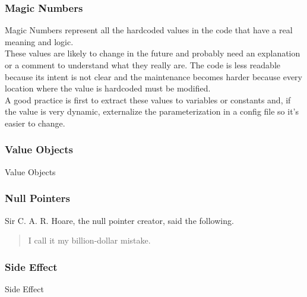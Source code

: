 \subsubsection{Magic Numbers}
Magic Numbers represent all the hardcoded values in the code that have
a real meaning and logic. \\
\newline
These values are likely to change in the future and probably need an
explanation or a comment to understand what they really are.
The code is less readable because its intent is not clear and the
maintenance becomes harder because every location where the value
is hardcoded must be modified. \\
A good practice is first to extract these values to variables or
constants and, if the value is very dynamic, externalize the
parameterization in a config file so it's easier to change.

\subsubsection{Value Objects}
Value Objects

\subsubsection{Null Pointers}
Sir C. A. R. Hoare, the null pointer creator, said the following.
\begin{quotation}
    I call it my billion-dollar mistake.
\end{quotation}

\subsubsection{Side Effect}
Side Effect

